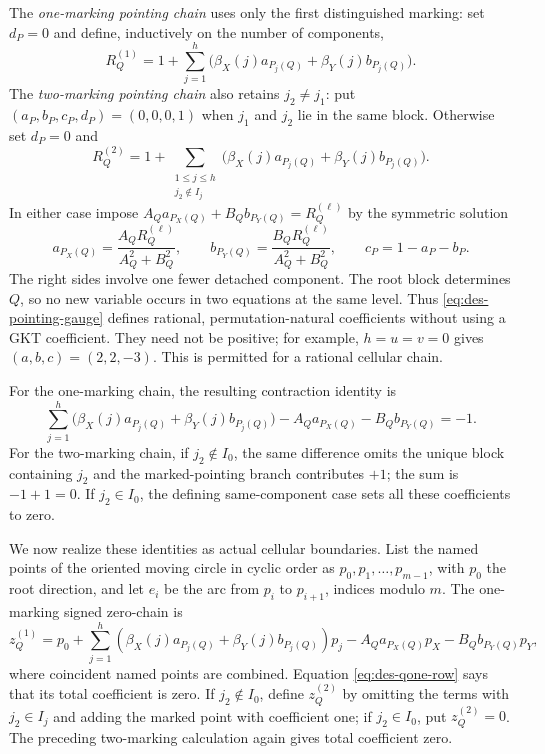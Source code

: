 The \emph{one-marking pointing chain} uses only the first distinguished marking: set $d_P=0$
and define, inductively on the number of components,
\begin{equation}
 R_Q^{(1)}=1+\sum_{j=1}^h
 \bigl(\beta_X(j)a_{P_j(Q)}+\beta_Y(j)b_{P_j(Q)}\bigr).
 \label{eq:des-qone-gauge}
\end{equation}
The \emph{two-marking pointing chain} also retains $j_2\ne j_1$: put
$(a_P,b_P,c_P,d_P)=(0,0,0,1)$ when $j_1$ and $j_2$ lie in the same block.
Otherwise set $d_P=0$ and
\begin{equation}
 R_Q^{(2)}=1+\sum_{\substack{1\leq j\leq h\\j_2\notin I_j}}
 \bigl(\beta_X(j)a_{P_j(Q)}+\beta_Y(j)b_{P_j(Q)}\bigr).
 \label{eq:des-qtwo-gauge}
\end{equation}
In either case impose
$A_Qa_{P_X(Q)}+B_Qb_{P_Y(Q)}=R_Q^{(\ell)}$ by the symmetric solution
\begin{equation}
 a_{P_X(Q)}=\frac{A_QR_Q^{(\ell)}}{A_Q^2+B_Q^2},
 \qquad
 b_{P_Y(Q)}=\frac{B_QR_Q^{(\ell)}}{A_Q^2+B_Q^2},
 \qquad c_P=1-a_P-b_P.
 \label{eq:des-pointing-gauge}
\end{equation}
The right sides involve one fewer detached component.  The root block
determines $Q$, so no new variable occurs in two equations at the same level.
Thus \eqref{eq:des-pointing-gauge} defines rational, permutation-natural
coefficients without using a GKT coefficient.  They need not be positive;
for example, $h=u=v=0$ gives $(a,b,c)=(2,2,-3)$.  This is permitted for a
rational cellular chain.

For the one-marking chain, the resulting contraction identity is
\begin{equation}
 \sum_{j=1}^h
 \bigl(\beta_X(j)a_{P_j(Q)}+\beta_Y(j)b_{P_j(Q)}\bigr)
 -A_Qa_{P_X(Q)}-B_Qb_{P_Y(Q)}=-1.
 \label{eq:des-qone-row}
\end{equation}
For the two-marking chain, if $j_2\notin I_0$, the same difference omits the unique block
containing $j_2$ and the marked-pointing branch contributes $+1$; the sum is
$-1+1=0$.  If $j_2\in I_0$, the defining same-component case sets all these
coefficients to zero.

We now realize these identities as actual cellular boundaries.  List the named
points of the oriented moving circle in cyclic order as
$p_0,p_1,\ldots,p_{m-1}$, with $p_0$ the root direction, and let $e_i$ be
the arc from $p_i$ to $p_{i+1}$, indices modulo $m$.  The one-marking signed
zero-chain is
\begin{equation}
 z_Q^{(1)}=p_0
 +\sum_{j=1}^h
  (\beta_X(j)a_{P_j(Q)}+\beta_Y(j)b_{P_j(Q)})p_j
 -A_Qa_{P_X(Q)}p_X-B_Qb_{P_Y(Q)}p_Y,
 \label{eq:des-qone-zero-chain}
\end{equation}
where coincident named points are combined.  Equation
\eqref{eq:des-qone-row} says that its total coefficient is zero.  If
$j_2\notin I_0$, define $z_Q^{(2)}$ by omitting the terms with
$j_2\in I_j$ and adding the marked point with coefficient one; if
$j_2\in I_0$, put $z_Q^{(2)}=0$.  The preceding two-marking calculation again gives
total coefficient zero.

